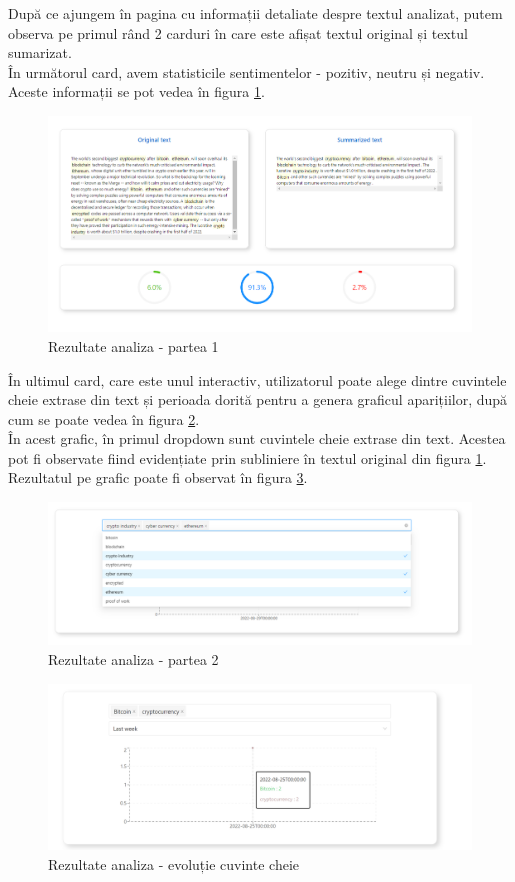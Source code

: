 După ce ajungem în pagina cu informații detaliate despre textul analizat, putem observa pe primul rând 2 carduri în care este afișat textul original și textul sumarizat. \\
În următorul card, avem statisticile sentimentelor - pozitiv, neutru și negativ. Aceste informații se pot vedea în figura \ref{fig:seeMore1}.
\begin{figure}[H]
	\centering
	\includegraphics[width=150mm]{figs/seeMore1.png}
    \caption{Rezultate analiza - partea 1}
	\label{fig:seeMore1}
\end{figure}

În ultimul card, care este unul interactiv, utilizatorul poate alege dintre cuvintele cheie extrase din text și perioada dorită pentru a genera graficul aparițiilor, după cum se poate vedea în figura \ref{fig:seeMore2}. \\
În acest grafic, în primul dropdown sunt cuvintele cheie extrase din text. Acestea pot fi observate fiind evidențiate prin subliniere în textul original din figura \ref{fig:seeMore1}. 
Rezultatul pe grafic poate fi observat în figura \ref{fig:keywordsEvolution}.

\begin{figure}[H]
	\centering
	\includegraphics[width=150mm]{figs/seeMore2.png}
    \caption{Rezultate analiza - partea 2}
	\label{fig:seeMore2}
\end{figure}
\begin{figure}[H]
	\centering
	\includegraphics[width=150mm]{figs/keywordsEvolution.png}
    \caption{Rezultate analiza - evoluție cuvinte cheie}
	\label{fig:keywordsEvolution}
\end{figure}

